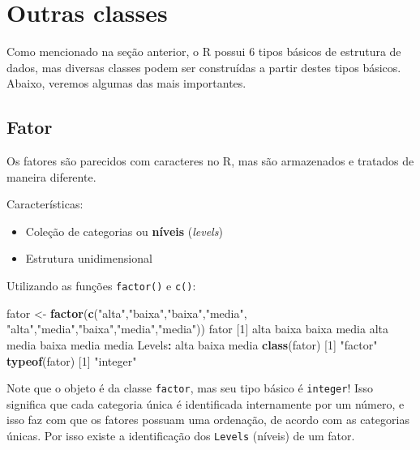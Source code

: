 \documentclass[10pt,a4paper]{book}
\newenvironment{Shaded}{\begin{snugshade}}{\end{snugshade}}
\newcommand{\KeywordTok}[1]{\textcolor[rgb]{0.13,0.29,0.53}{\textbf{#1}}}
\newcommand{\DecValTok}[1]{\textcolor[rgb]{0.00,0.00,0.81}{#1}}
\newcommand{\StringTok}[1]{\textcolor[rgb]{0.31,0.60,0.02}{#1}}
\newcommand{\OperatorTok}[1]{\textcolor[rgb]{0.81,0.36,0.00}{\textbf{#1}}}
\newcommand{\NormalTok}[1]{#1}
\providecommand{\tightlist}{%
  \setlength{\itemsep}{0pt}\setlength{\parskip}{0pt}}
\begin{document}
\section{Outras classes}\label{outras-classes}

Como mencionado na seção anterior, o R possui 6 tipos básicos de
estrutura de dados, mas diversas classes podem ser construídas a partir
destes tipos básicos. Abaixo, veremos algumas das mais importantes.

\subsection{Fator}\label{fator}

Os fatores são parecidos com caracteres no R, mas são armazenados e
tratados de maneira diferente.

Características:

\begin{itemize}
\tightlist
\item
  Coleção de categorias ou \textbf{níveis} (\emph{levels})
\item
  Estrutura unidimensional
\end{itemize}

Utilizando as funções \texttt{factor()} e \texttt{c()}:

\begin{Shaded}
\begin{Highlighting}[]
\NormalTok{fator <-}\StringTok{ }\KeywordTok{factor}\NormalTok{(}\KeywordTok{c}\NormalTok{(}\StringTok{"alta"}\NormalTok{,}\StringTok{"baixa"}\NormalTok{,}\StringTok{"baixa"}\NormalTok{,}\StringTok{"media"}\NormalTok{,}
                  \StringTok{"alta"}\NormalTok{,}\StringTok{"media"}\NormalTok{,}\StringTok{"baixa"}\NormalTok{,}\StringTok{"media"}\NormalTok{,}\StringTok{"media"}\NormalTok{))}
\NormalTok{fator}
\NormalTok{[}\DecValTok{1}\NormalTok{] alta  baixa baixa media alta  media baixa media media}
\NormalTok{Levels}\OperatorTok{:}\StringTok{ }\NormalTok{alta baixa media}
\KeywordTok{class}\NormalTok{(fator)}
\NormalTok{[}\DecValTok{1}\NormalTok{] }\StringTok{"factor"}
\KeywordTok{typeof}\NormalTok{(fator)}
\NormalTok{[}\DecValTok{1}\NormalTok{] }\StringTok{"integer"}
\end{Highlighting}
\end{Shaded}

Note que o objeto é da classe \texttt{factor}, mas seu tipo básico é
\texttt{integer}! Isso significa que cada categoria única é identificada
internamente por um número, e isso faz com que os fatores possuam uma
ordenação, de acordo com as categorias únicas. Por isso existe a
identificação dos \texttt{Levels} (níveis) de um fator.
\end{document}
